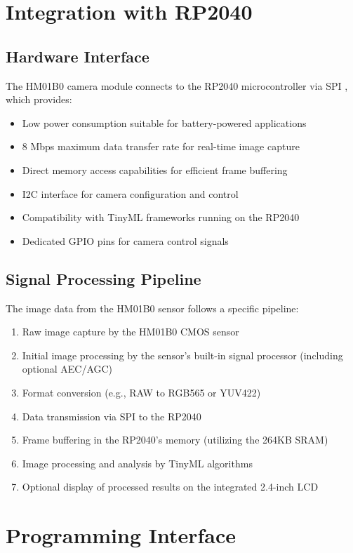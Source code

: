 \section{Integration with RP2040}
\subsection{Hardware Interface}
The HM01B0 camera module connects to the RP2040 microcontroller via SPI \cite{Arducam:2023, Himax:2019}, which provides:
\begin{itemize}
	\item Low power consumption suitable for battery-powered applications
	\item 8 Mbps maximum data transfer rate for real-time image capture
	\item Direct memory access capabilities for efficient frame buffering
	\item I2C interface for camera configuration and control
	\item Compatibility with TinyML frameworks running on the RP2040
	\item Dedicated GPIO pins for camera control signals
\end{itemize}

\subsection{Signal Processing Pipeline}
The image data from the HM01B0 sensor follows a specific pipeline:
\begin{enumerate}
	\item Raw image capture by the HM01B0 CMOS sensor
	\item Initial image processing by the sensor's built-in signal processor (including optional AEC/AGC)
	\item Format conversion (e.g., RAW to RGB565 or YUV422)
	\item Data transmission via SPI to the RP2040
	\item Frame buffering in the RP2040's memory (utilizing the 264KB SRAM)
	\item Image processing and analysis by TinyML algorithms
	\item Optional display of processed results on the integrated 2.4-inch LCD
\end{enumerate}

\section{Programming Interface}
